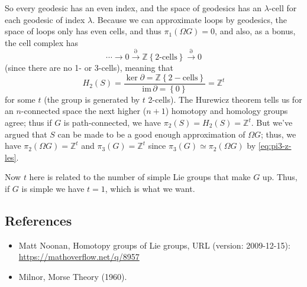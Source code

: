 \documentclass{report}
\begin{document}
So every geodesic has an even index, and the space of geodesics has an $ \lambda
$-cell for each geodesic of index $ \lambda $. Because we can approximate 
loops by geodesics, the space of loops only has even cells, and thus 
$ \pi_{1}(\Omega G) = 0$, and also, as a bonus, the cell complex has
\begin{equation*}
	\cdots\longrightarrow 0 \overset{\partial}{\longrightarrow} \mathbb{Z}\!\left\{2\text{-cells}\right\}
	\overset{\partial}{\longrightarrow} 0
\end{equation*}
(since there are no 1- or 3-cells), meaning that 
\begin{equation*}
	H_2(S) = \frac{\ker\partial =
	\mathbb{Z}\!\left\{2-\text{cells}\right\}}{\text{im}\,\partial = \left\{0\right\}}
	= \mathbb{Z}^t
\end{equation*}
for some $ t $ (the group is generated by $ t $ 2-cells). The Hurewicz theorem 
tells us for an $ n $-connected space the next higher ($ n+1 $) homotopy 
and homology groups agree; thus if $ G $ is path-connected, we have $ \pi_2(S) = 
H_2(S) =\mathbb{Z}^t $. But we've argued that $ S $ can be made to be a good 
enough approximation of $ \Omega G $; thus, we have $ \pi_2(\Omega G) =
\mathbb{Z}^t $ and $ \pi_3(G) = \mathbb{Z}^t $ since $ \pi_3(G) \simeq
\pi_2(\Omega G) $ by \cref{eq:pi3-z-les}. 

Now $ t $ here is related to the number of simple Lie groups that make $ G $ up. 
Thus, if $ G $ is simple we have $ t=1 $, which is what we want.

\subsection*{References}
\begin{itemize}[nosep]
\item Matt Noonan, Homotopy groups of Lie groups, URL (version: 2009-12-15):
	\url{https://mathoverflow.net/q/8957}
\item Milnor, Morse Theory (1960).
\end{itemize}

\end{document}

